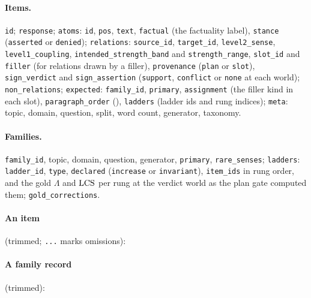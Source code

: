 {\raggedright
\paragraph{Items.} \texttt{id}; \texttt{response}; \texttt{atoms}: \texttt{id}, \texttt{pos},
\texttt{text}, \texttt{factual} (the factuality label), \texttt{stance} (\texttt{asserted} or
\texttt{denied}); \texttt{relations}: \texttt{source\_id}, \texttt{target\_id},
\texttt{level2\_sense}, \texttt{level1\_coupling}, \texttt{intended\_strength\_band} and
\texttt{strength\_range}, \texttt{slot\_id} and \texttt{filler} (for relations drawn by a filler),
\texttt{provenance} (\texttt{plan} or \texttt{slot}), \texttt{sign\_verdict} and
\texttt{sign\_assertion} (\texttt{support}, \texttt{conflict} or \texttt{none} at each world);
\texttt{non\_relations}; \texttt{expected}: \texttt{family\_id}, \texttt{primary},
\texttt{assignment} (the filler kind in each slot), \texttt{paragraph\_order} (),
\texttt{ladders} (ladder ids and rung indices); \texttt{meta}: topic, domain, question, split,
word count, generator, taxonomy.

\paragraph{Families.} \texttt{family\_id}, topic, domain, question, generator, \texttt{primary},
\texttt{rare\_senses}; \texttt{ladders}: \texttt{ladder\_id}, \texttt{type}, \texttt{declared}
(\texttt{increase} or \texttt{invariant}), \texttt{item\_ids} in rung order, and the gold $\Lambda$
and $\mathrm{LCS}$ per rung at the verdict world as the plan gate computed them; \texttt{gold\_corrections}.
\par}

\paragraph{An item} (trimmed; \texttt{...} marks omissions):

\paragraph{A family record} (trimmed):

